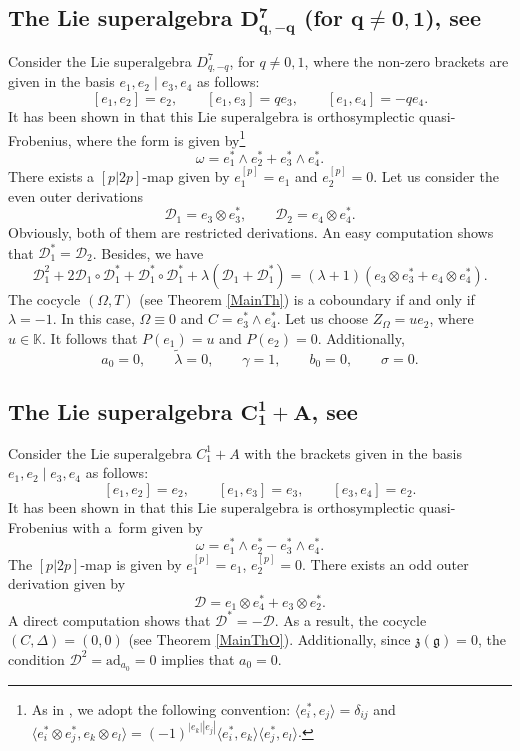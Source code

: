 \documentclass[10pt,a4paper]{amsart}
\numberwithin{equation}{section}
\begin{document}
\subsection[The Lie superalgebra D\^{}7\_\{q,-q\} (for q not = 0,1), see cite{Ba}]{The Lie superalgebra $\boldsymbol{D^7_{q,-q}}$ (for $\boldsymbol{q\not = 0,1}$), see \cite{Ba}} Consider the Lie superalgebra $D^7_{q,-q}$, for $q\not = 0,1$, where the non-zero brackets are given in the basis $e_1, e_2\mid e_3, e_4$ as follows:
\[
[e_1, e_2]=e_2, \qquad [e_1, e_3]= q e_3, \qquad [e_1, e_4]=-q e_4.
\]
It has been shown in \cite{BM} that this Lie superalgebra is orthosymplectic quasi-Frobenius, where the form is given by\footnote{As in \cite{BM}, we adopt the following convention: $\langle e_i^*, e_j\rangle=\delta_{ij}$ and $\langle e_i^*\otimes e_j^*, e_k\otimes e_l\rangle= (-1)^{|e_k||e_j|} \langle e_i^*, e_k \rangle\langle e_j^*, e_l\rangle $.}
\[
\omega= e_1^*\wedge e_2^*+e_3^*\wedge e_4^*.
\]
There exists a $[p|2p]$-map given by $e_1^{[p]}=e_1$ and $e_2^{[p]}=0.$ Let us consider the even outer derivations
\[
{\mathscr D}_1= e_3\otimes e_3^*, \qquad {\mathscr D}_2=e_4\otimes e_4^*.
\]
Obviously, both of them are restricted derivations. An easy computation shows that ${\mathscr D}_1^*={\mathscr D}_2$. Besides, we have
\[
{\mathscr D}_1^2+ 2 {\mathscr D}_1\circ {\mathscr D}_1^*+{\mathscr D}_1^*\circ {\mathscr D}_1^* +\lambda({\mathscr D}_1+{\mathscr D}_1^*)=(\lambda+1)(e_3\otimes e_3^*+ e_4\otimes e_4^*).
\]
The cocycle $(\Omega,T)$ (see Theorem \ref{MainTh}) is a coboundary if and only if $\lambda=-1$. In this case, $\Omega \equiv 0$ and $C=e_3^*\wedge e_4^*$. Let us choose $Z_\Omega=u e_2$, where $u\in \mathbb K$. It follows that $P(e_1)=u$ and $P(e_2)=0$. Additionally,
\[
a_0=0, \qquad \tilde \lambda=0, \qquad \gamma=1, \qquad b_0=0, \qquad \sigma=0.
\]

\subsection[The Lie superalgebra C\_1\^{}1+A, see \protect{[2]}]{The Lie superalgebra $\boldsymbol{C_1^1+A}$, see \cite{Ba}}

 Consider the Lie superalgebra $C_1^1+A$ with the brackets given in the basis $e_1, e_2\mid e_3, e_4$ as follows:%
\[
[e_1, e_2]=e_2, \qquad [e_1, e_3]=e_3,\qquad [e_3, e_4]=e_2.
\]
It has been shown in \cite{BM} that this Lie superalgebra is orthosymplectic quasi-Frobenius with a~form given by
\[
\omega=e_1^*\wedge e_2^* - e_3^*\wedge e_4^*.
\]
The $[p|2p]$-map is given by
$
e_1^{[p]}=e_1$, $e_2^{[p]}=0$. There exists an odd outer derivation given by
\[
{\mathscr D}=e_1\otimes e_4^*+e_3\otimes e_2^*.
\]
A direct computation shows that ${\mathscr D}^*=-{\mathscr D}$. As a result, the cocycle $(C, \Delta)=(0,0)$ (see Theorem \ref{MainThO}). Additionally, since ${\mathfrak z}(\mathfrak{g})=0$, the condition ${\mathscr D}^2=\mathrm{ad}_{a_0}=0$ implies that $a_0=0$.
\end{document}
